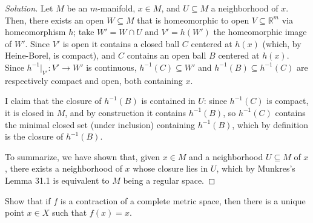 \documentclass[10pt]{article}
\providecommand{\RR}{\mathbb R}
\providecommand{\inv}{^{-1}}
\newenvironment{soln}{\begin{proof}[Solution]}{\end{proof}}
\begin{document}
\begin{soln}
    Let $M$ be an $m$-manifold, $x\in M$, and $U\subseteq M$
    a neighborhood of $x$. Then, there exists an open
    $W\subseteq M$ that is homeomorphic to open $V\subseteq\RR^m$
    via homeomorphism $h$; take $W' = W\cap U$
    and $V' = h(W')$ the homeomorphic image of $W'$.
    Since $V'$ is open it contains a closed ball $C$ centered at $h(x)$
    (which, by Heine-Borel, is compact),
    and $C$ contains an open ball $B$ centered at $h(x)$.
    Since $h\inv|_{V'}\colon V'\to W'$ is continuous,
    $h\inv(C)\subseteq W'$ and
    $h\inv(B)\subseteq h\inv(C)$ are respectively compact and open,
    both containing $x$.

    I claim that the closure of $h\inv(B)$
    is contained in $U$: since $h\inv(C)$ is compact, it is closed in $M$,
    and by construction it contains $h\inv(B)$,
    so $h\inv(C)$ contains the minimal closed set (under inclusion)
    containing $h\inv(B)$, which by definition is the closure of $h\inv(B)$.

    To summarize, we have shown that, given $x\in M$
    and a neighborhood $U\subseteq M$ of $x$,
    there exists a neighborhood of $x$ whose closure lies in $U$,
    which by Munkres's Lemma 31.1 is equivalent to $M$ being a regular space.
\end{soln}

\begin{problem}
    [Munkres 43.5]
    Show that if $f$ is a contraction of a complete metric space,
    then there is a unique point $x\in X$ such that $f(x) = x$.
\end{problem}
\end{document}
